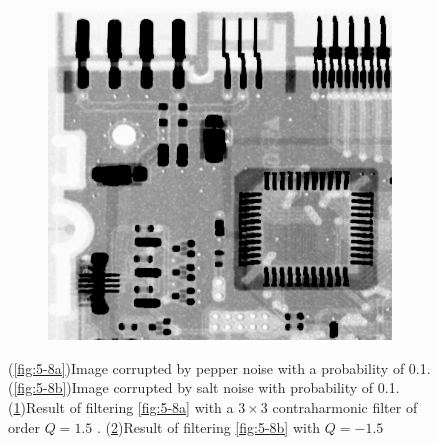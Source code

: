 \begin{figure}[h]
\begin{subfigure}[b]{0.4\linewidth}
		\caption{}
		\label{fig:5-8c}
	\end{subfigure}
  	\begin{subfigure}[b]{0.4\linewidth}
		\includegraphics[width=\linewidth]{myfigure/p4/42-salt-contraharmo.png}
		\caption{}
		\label{fig:5-8d}
	\end{subfigure}
  	\caption{(\ref{fig:5-8a})Image corrupted by pepper noise with a probability of 0.1. (\ref{fig:5-8b})Image corrupted by salt noise with probability of 0.1. (\ref{fig:5-8c})Result of filtering \ref{fig:5-8a} with a $3\times 3$ contraharmonic filter of order $Q=1.5$ . (\ref{fig:5-8d})Result of filtering \ref{fig:5-8b} with $Q=-1.5$}
  	\label{fig:5-8}
\end{figure}

